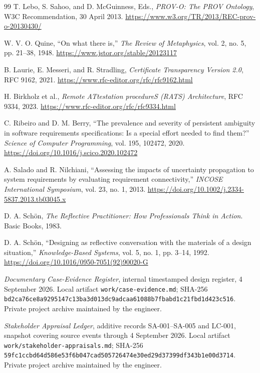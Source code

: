 \documentclass[10pt,a4paper]{article}
\begin{document}
\begin{thebibliography}{99}
T. Lebo, S. Sahoo, and D. McGuinness, Eds., \emph{PROV-O: The PROV Ontology}, W3C Recommendation, 30 April 2013. \url{https://www.w3.org/TR/2013/REC-prov-o-20130430/}

W. V. O. Quine, ``On what there is,'' \emph{The Review of Metaphysics}, vol. 2, no. 5, pp. 21--38, 1948. \url{https://www.jstor.org/stable/20123117}

B. Laurie, E. Messeri, and R. Stradling, \emph{Certificate Transparency Version 2.0}, RFC 9162, 2021. \url{https://www.rfc-editor.org/rfc/rfc9162.html}

H. Birkholz et al., \emph{Remote ATtestation procedureS (RATS) Architecture}, RFC 9334, 2023. \url{https://www.rfc-editor.org/rfc/rfc9334.html}

C. Ribeiro and D. M. Berry, ``The prevalence and severity of persistent ambiguity in software requirements specifications: Is a special effort needed to find them?'' \emph{Science of Computer Programming}, vol. 195, 102472, 2020. \url{https://doi.org/10.1016/j.scico.2020.102472}

A. Salado and R. Nilchiani, ``Assessing the impacts of uncertainty propagation to system requirements by evaluating requirement connectivity,'' \emph{INCOSE International Symposium}, vol. 23, no. 1, 2013. \url{https://doi.org/10.1002/j.2334-5837.2013.tb03045.x}

D. A. Sch\"on, \emph{The Reflective Practitioner: How Professionals Think in Action}. Basic Books, 1983.

D. A. Sch\"on, ``Designing as reflective conversation with the materials of a design situation,'' \emph{Knowledge-Based Systems}, vol. 5, no. 1, pp. 3--14, 1992. \url{https://doi.org/10.1016/0950-7051(92)90020-G}

\emph{Documentary Case-Evidence Register}, internal timestamped design register, 4 September 2026. Local artifact \nolinkurl{work/case-evidence.md}; SHA-256 \nolinkurl{bd2ca76ce8a9295147c13ba3d013dc9adcaa61088b7fbabd1c21fbd1d423c516}. Private project archive maintained by the engineer.

\emph{Stakeholder Appraisal Ledger}, additive records SA-001--SA-005 and LC-001, snapshot covering source events through 4 September 2026. Local artifact \nolinkurl{work/stakeholder-appraisals.md}; SHA-256 \nolinkurl{59fc1ccbd64d586e53f6b047cad505726474e30ed29d37399df343b1e00d3714}. Private project archive maintained by the engineer.


\end{thebibliography}
\end{document}
